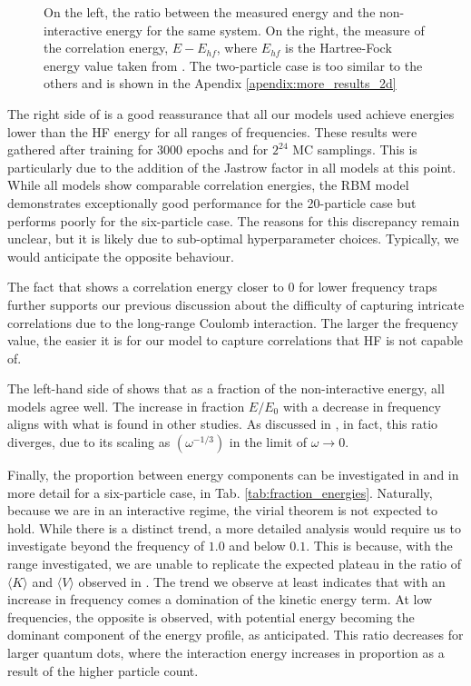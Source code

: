\begin{figure}[H]
\begin{subfigure}{\textwidth}
    \end{subfigure}
    \caption{On the left, the ratio between the measured energy and the non-interactive energy for the same system. On the right, the measure of the correlation energy, $E - E_{hf}$, where $E_{hf}$ is the Hartree-Fock energy value taken from \cite{mariadasonQuantum}. The two-particle case is too similar to the others and is shown in the Apendix \ref{apendix:more_results_2d}}
    \label{fig:correlation_energies}
\end{figure}

The right side of  is a good reassurance that all our models used achieve energies lower than the HF energy for all ranges of frequencies. These results were gathered after training for 3000 epochs and for $2^{24}$ MC samplings. This is particularly due to the addition of the Jastrow factor in all models at this point. While all models show comparable correlation energies, the RBM model demonstrates exceptionally good performance for the 20-particle case but performs poorly for the six-particle case. The reasons for this discrepancy remain unclear, but it is likely due to sub-optimal hyperparameter choices. Typically, we would anticipate the opposite behaviour.

The fact that  shows a correlation energy closer to 0 for lower frequency traps further supports our previous discussion about the difficulty of capturing intricate correlations due to the long-range Coulomb interaction. The larger the frequency value, the easier it is for our model to capture correlations that HF is not capable of. %

The left-hand side of  shows that as a fraction of the non-interactive energy, all models agree well. The increase in fraction $E/E_0$ with a decrease in frequency aligns with what is found in other studies. As discussed in \cite{kroeze2016trappedelectronsquantumdegenerate}, in fact, this ratio diverges, due to its scaling as $(\omega^{-1/3})$ in the limit of $\omega \to 0$.

Finally, the proportion between energy components can be investigated in  and in more detail for a six-particle case, in Tab. \ref{tab:fraction_energies}. Naturally, because we are in an interactive regime, the virial theorem is not expected to hold. While there is a distinct trend, a more detailed analysis would require us to investigate beyond the frequency of $1.0$ and below $0.1$. This is because, with the range investigated, we are unable to replicate the expected plateau in the ratio of $\langle K\rangle$ and $\langle V\rangle$ observed in \cite{Nordhagen2019}. The trend we observe at least indicates that with an increase in frequency comes a domination of the kinetic energy term. At low frequencies, the opposite is observed, with potential energy becoming the dominant component of the energy profile, as anticipated. This ratio decreases for larger quantum dots, where the interaction energy increases in proportion as a result of the higher particle count.

